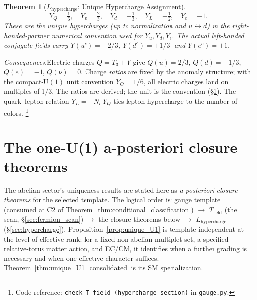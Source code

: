 \documentclass[11pt]{article}
\newtheorem{theorem}{Theorem}[section]
\theoremstyle{definition}
\newcommand{\U}{\mathrm{U}}
\newcommand{\coderef}[2]{\footnote{Code reference: \texttt{#1} in \texttt{#2}.}}
\begin{document}
\begin{theorem}[$L_{\mathrm{hypercharge}}$: Unique Hypercharge Assignment]
\label{thm:hypercharge}
\[
  Y_Q = \tfrac{1}{6}, \quad
  Y_u = \tfrac{2}{3}, \quad
  Y_d = -\tfrac{1}{3}, \quad
  Y_L = -\tfrac{1}{2}, \quad
  Y_e = -1.
\]
These are the unique hypercharges (up to normalization and
$u\leftrightarrow d$) in the right-handed-partner numerical
convention used for $Y_u,Y_d,Y_e$.  The actual left-handed conjugate
fields carry $Y(u^c)=-2/3$, $Y(d^c)=+1/3$, and $Y(e^c)=+1$.
\end{theorem}

\noindent\textit{Consequences.}\quad Electric charges $Q = T_3 + Y$ give
$Q(u) = 2/3$, $Q(d) = -1/3$, $Q(e) = -1$, $Q(\nu) = 0$.  Charge
\emph{ratios} are fixed by the anomaly structure; with the
compact-$\U(1)$ unit convention $Y_Q = 1/6$, all electric charges
land on multiples of $1/3$.  The ratios are derived; the unit is the
convention (\S\ref{sec:one_u1_closure}).  The quark--lepton relation
$Y_L = -N_c\, Y_Q$ ties lepton hypercharge to the number of colors.
\coderef{check\_T\_field (hypercharge section)}{gauge.py}


\newpage




\section{The one-U(1) a-posteriori closure theorems}
\label{sec:one_u1_closure}

The abelian sector's uniqueness results are stated here as
\emph{a-posteriori closure theorems} for the selected template.  The
logical order is: gauge template (consumed at C2 of
Theorem~\ref{thm:conditional_classification}) $\to$
$T_{\mathrm{field}}$ (the scan, \S\ref{sec:fermion_scan}) $\to$ the
closure theorems below $\to$ $L_{\mathrm{hypercharge}}$
(\S\ref{sec:hypercharge}).  Proposition~\ref{prop:unique_U1} is
template-independent at the level of effective rank: for a fixed
non-abelian multiplet set, a specified relative-torus matter action,
and EC/CM, it identifies when a further grading is necessary and when
one effective character suffices.  Theorem~\ref{thm:unique_U1_consolidated} is its SM
specialization.
\end{document}

